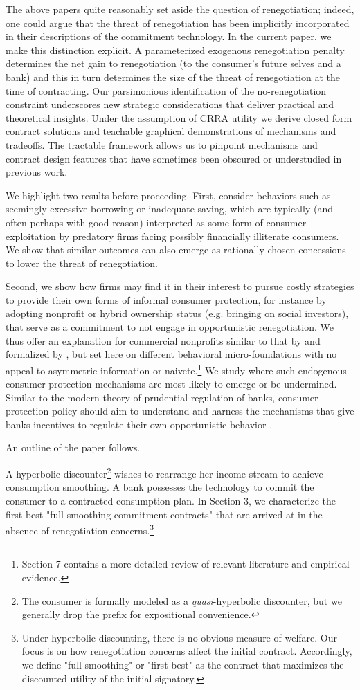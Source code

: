 \documentclass[11pt,english]{article}
\theoremstyle{plain}
\theoremstyle{definition}
\begin{document}
The above papers quite reasonably set aside the question of renegotiation; indeed, one could argue that the threat of renegotiation has been implicitly incorporated in their descriptions of the commitment technology. In the current paper, we make this distinction explicit. A parameterized exogenous renegotiation penalty
determines the net gain to renegotiation (to the consumer's future selves and a bank) and this in turn determines the size of the threat of renegotiation at the time of contracting. Our parsimonious identification of the no-renegotiation constraint underscores new strategic considerations that deliver practical and theoretical insights. Under the assumption of CRRA utility we derive closed form contract solutions and teachable graphical demonstrations of mechanisms and tradeoffs. The tractable framework allows us to pinpoint mechanisms and contract design features that have sometimes been obscured or understudied in previous work.

We highlight two results before proceeding. First, consider behaviors such as seemingly excessive borrowing or inadequate saving, which are typically (and often perhaps with good reason) interpreted as some form of consumer exploitation by predatory firms facing possibly financially illiterate consumers. We show that similar outcomes can also emerge as rationally chosen concessions to lower the threat of renegotiation. 

Second, we show how firms may find it in their interest to pursue costly strategies to provide their own forms of informal consumer protection, for instance by adopting nonprofit or hybrid ownership status (e.g. bringing on social investors), that serve as a commitment to not engage in opportunistic renegotiation. We thus offer an explanation for commercial nonprofits similar to that by \citet{hansmann1996a} and formalized by \citet{glaeser2001}, but set here on different behavioral micro-foundations with no appeal to asymmetric information or naivete.\footnote{Section 7 contains a more detailed review of relevant literature and empirical evidence.}  We study where such endogenous consumer protection mechanisms are most likely to emerge or be undermined. Similar to the modern theory of prudential regulation of banks, consumer protection policy should aim to understand and harness the mechanisms that give banks incentives to regulate their own opportunistic behavior \citep{dewatripont1999}. 

An outline of the paper follows.

A hyperbolic discounter\footnote{The consumer is formally modeled as a \emph{quasi}-hyperbolic discounter, but we generally drop the prefix for expositional convenience.} wishes to rearrange her income stream to achieve consumption smoothing. A bank possesses the technology to commit the consumer to a contracted consumption plan. In Section 3, we characterize the first-best "full-smoothing commitment contracts" that are arrived at in the absence of renegotiation concerns.\footnote{Under hyperbolic discounting, there is no obvious measure of welfare. Our focus is on how renegotiation concerns affect the initial contract. Accordingly, we define "full smoothing" or "first-best" as the contract that maximizes the discounted utility of the initial signatory.}
\end{document}
